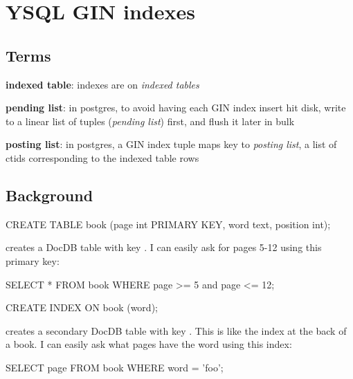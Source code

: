 \documentclass[11pt]{article}
\begin{document}
\hypertarget{ysql-gin-indexes}{%
\section{YSQL GIN indexes}\label{ysql-gin-indexes}}

\hypertarget{terms}{%
\subsection{Terms}\label{terms}}

\begin{oparts}
\item
  \textbf{indexed table}: indexes are on \emph{indexed tables}
\item
  \textbf{pending list}: in postgres, to avoid having each GIN index insert hit
  disk, write to a linear list of tuples (\emph{pending list}) first, and flush
  it later in bulk
\item
  \textbf{posting list}: in postgres, a GIN index tuple maps key to
  \emph{posting list}, a list of ctids corresponding to the indexed table rows
\end{oparts}

\hypertarget{background}{%
\subsection{Background}\label{background}}

\begin{sqlcode}
CREATE TABLE book (page int PRIMARY KEY, word text, position int);
\end{sqlcode}

creates a DocDB table with key . I can easily ask for
pages 5-12 using this primary key:

\begin{sqlcode}
SELECT * FROM book WHERE page >= 5 and page <= 12;
\end{sqlcode}

\begin{sqlcode}
CREATE INDEX ON book (word);
\end{sqlcode}

creates a secondary DocDB table with key . This
is like the index at the back of a book. I can easily ask what pages have the
word  using this index:

\begin{sqlcode}
SELECT page FROM book WHERE word = 'foo';
\end{sqlcode}
\end{document}
